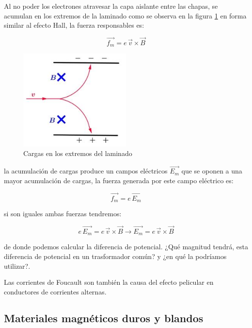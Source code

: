 Al no poder los electrones atravesar la capa aislante entre las chapas, se acumulan en los extremos de la laminado como se observa en la figura \ref{fig:Foucault} en forma similar al efecto Hall, la fuerza responsables es:


\begin{equation}
\vec{f_{m}} = e\, \vec{v} \times \vec{B}
\end{equation}

\begin{figure}[H]
    \centering
    \includegraphics[width=0.5\textwidth]{./Figures/Foucault}
	\caption{Cargas en los extremos del laminado}
	\label{fig:Foucault}
\end{figure}

la acumulación de cargas produce un campos eléctricos $\vec{E_{m}}$ que se oponen a una mayor acumulación de cargas, la fuerza generada por este campo eléctrico es:

\begin{equation}
\vec{f_{m}} = e\, \vec{E_{m}}
\end{equation}

si son iguales ambas fuerzas tendremos:

\begin{equation}
e\, \vec{E_{m}} = e\, \vec{v} \times \vec{B} \rightarrow \vec{E_{m}} = e\, \vec{v} \times \vec{B}
\end{equation}

de donde podemos calcular la diferencia de potencial. ¿Qué magnitud tendrá, esta diferencia de potencial en un trasformador común? y ¿en qué la podríamos utilizar?.

Las corrientes de Foucault son también la causa del efecto pelicular en conductores de corrientes alternas.


\subsection{Materiales magnéticos duros y blandos}


